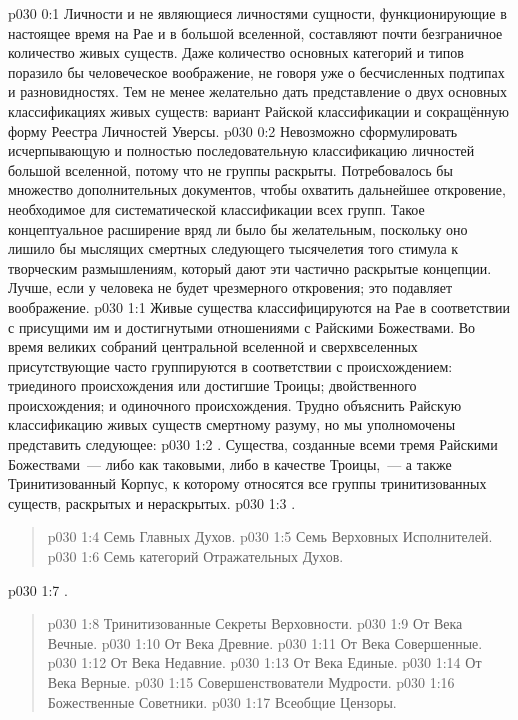 \author{Могущественный Посланник}
\vs p030 0:1 Личности и не являющиеся личностями сущности, функционирующие в настоящее время на Рае и в большой вселенной, составляют почти безграничное количество живых существ. Даже количество основных категорий и типов поразило бы человеческое воображение, не говоря уже о бесчисленных подтипах и разновидностях. Тем не менее желательно дать представление о двух основных классификациях живых существ: вариант Райской классификации и сокращённую форму Реестра Личностей Уверсы.
\vs p030 0:2 Невозможно сформулировать исчерпывающую и полностью последовательную классификацию личностей большой вселенной, потому что не  группы раскрыты. Потребовалось бы множество дополнительных документов, чтобы охватить дальнейшее откровение, необходимое для систематической классификации всех групп. Такое концептуальное расширение вряд ли было бы желательным, поскольку оно лишило бы мыслящих смертных следующего тысячелетия того стимула к творческим размышлениям, который дают эти частично раскрытые концепции. Лучше, если у человека не будет чрезмерного откровения; это подавляет воображение.
\vs p030 1:1 Живые существа классифицируются на Рае в соответствии с присущими им и достигнутыми отношениями с Райскими Божествами. Во время великих собраний центральной вселенной  и сверхвселенных присутствующие часто группируются в соответствии с происхождением: триединого происхождения или достигшие Троицы; двойственного происхождения; и одиночного происхождения. Трудно объяснить Райскую классификацию живых существ смертному разуму, но мы уполномочены представить следующее:
\vs p030 1:2 . Существа, созданные всеми тремя Райскими Божествами~--- либо как таковыми, либо в качестве Троицы,~--- а также Тринитизованный Корпус, к которому относятся все группы тринитизованных существ, раскрытых и нераскрытых.
\vs p030 1:3 .
\begin{quote}
\vs p030 1:4 Семь Главных Духов.
\vs p030 1:5 Семь Верховных Исполнителей.
\vs p030 1:6 Семь категорий Отражательных Духов.
\end{quote}
\vs p030 1:7 .
\begin{quote}
\vs p030 1:8 Тринитизованные Секреты Верховности.
\vs p030 1:9 От Века Вечные.
\vs p030 1:10 От Века Древние.
\vs p030 1:11 От Века Совершенные.
\vs p030 1:12 От Века Недавние.
\vs p030 1:13 От Века Единые.
\vs p030 1:14 От Века Верные.
\vs p030 1:15 Совершенствователи Мудрости.
\vs p030 1:16 Божественные Советники.
\vs p030 1:17 Всеобщие Цензоры.
\end{quote}
